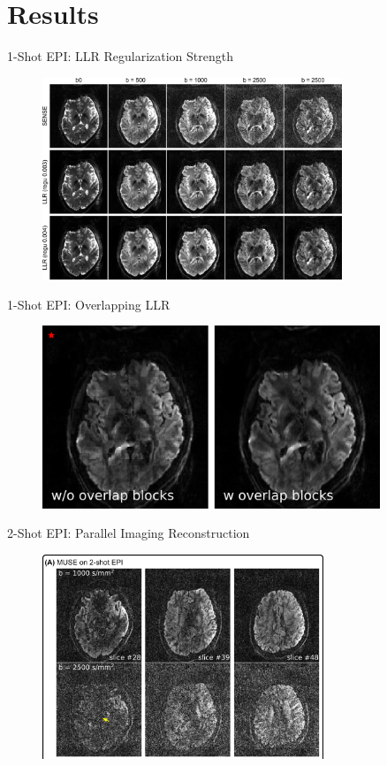 \documentclass[hyperref={colorlinks=true,linkcolor=blue}, aspectratio=169]{beamer}
\begin{document}
	\section{Results}
	
	\begin{frame}{1-Shot EPI: LLR Regularization Strength}
		\begin{figure}
			\includegraphics[width=0.8\textwidth]{figures/results/Pat3_PI_LLR_regu.png}
		\end{figure}
	\end{frame}

	\begin{frame}{1-Shot EPI: Overlapping LLR}
		\begin{figure}
			\includegraphics[width=0.9\textwidth]{figures/results/DWI_LLR_OverlapBlocks.png}
		\end{figure}
	\end{frame}

	\begin{frame}{2-Shot EPI: Parallel Imaging Reconstruction}
		\begin{figure}
			\includegraphics[width=0.75\textwidth]{figures/results/fig3_a.png}
		\end{figure}
	\end{frame}
\end{document}
